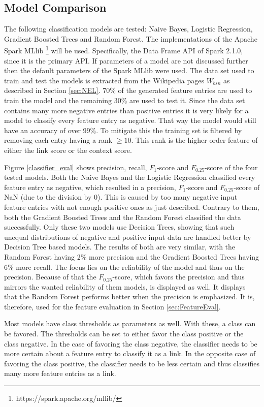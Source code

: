 \subsection{Model Comparison}
The following classification models are tested: Naive Bayes, Logistic Regression, Gradient Boosted Trees and Random Forest. The implementations of the Apache Spark MLlib \footnote{https://spark.apache.org/mllib/} will be used. Specifically, the Data Frame API of Spark 2.1.0, since it is the primary API. If parameters of a model are not discussed further then the default parameters of the Spark  MLlib were used. The data set used to train and test the models is extracted from the Wikipedia pages $W_{bsn}$ as described in Section \ref{sec:NEL}. 70\% of the generated feature entries are used to train the model and the remaining 30\% are used to test it. Since the data set contains many more negative entries than positive entries it is very likely for a model to classify every feature entry as negative. That way the model would still have an accuracy of over 99\%. To mitigate this the training set is filtered by removing each entry having a rank $\geq 10$. This rank is the higher order feature of either the link score or the context score.\par
Figure \ref{classifier_eval} shows precision, recall, $F_1$-score and $F_{0.25}$-score of the four tested models. Both the Naive Bayes and the Logistic Regression classified every feature entry as negative, which resulted in a precision, $F_1$-score and $F_{0.25}$-score of NaN (due to the division by 0). This is caused by too many negative input feature entries with not enough positive ones as just described. Contrary to them, both the Gradient Boosted Trees and the Random Forest classified the data successfully. Only these two models use Decision Trees, showing that such unequal distributions of negative and positive input data are handled better by Decision Tree based models. The results of both are very similar, with the Random Forest having 2\% more precision and the Gradient Boosted Trees having 6\% more recall. The focus lies on the reliability of the model and thus on the precision. Because of that the $F_{0.25}$-score, which favors the precision and thus mirrors the wanted reliability of them models, is displayed as well. It displays that the Random Forest performs better when the precision is emphasized. It is, therefore, used for the feature evaluation in Section \ref{sec:FeatureEval}.\par
Most models have class thresholds as parameters as well. With these, a class can be favored. The thresholds can be set to either favor the class positive or the class negative. In the case of favoring the class negative, the classifier needs to be more certain about a feature entry to classify it as a link. In the opposite case of favoring the class positive, the classifier needs to be less certain and thus classifies many more feature entries as a link.\par
